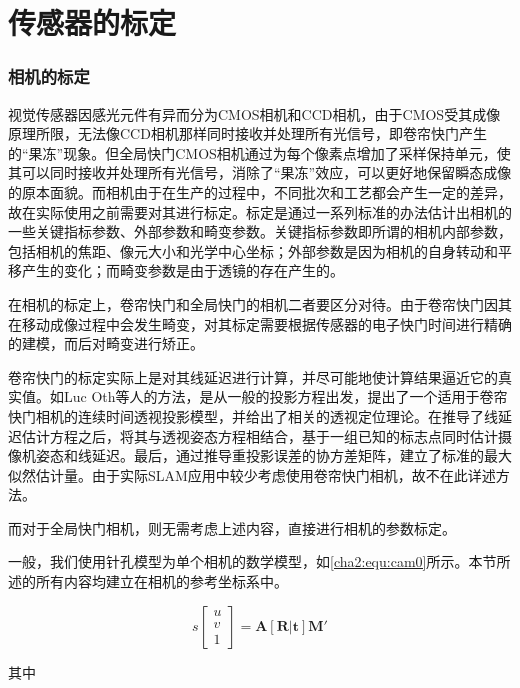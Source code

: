 \chapter{传感器的标定}
\label{cha:calibrations}

\subsection{相机的标定}
\label{cam_calib}
视觉传感器因感光元件有异而分为CMOS相机和CCD相机，由于CMOS受其成像原理所限，无法像CCD相机那样同时接收并处理所有光信号，即卷帘快门产生的“果冻”现象\cite{solutions2011shutter}。但全局快门CMOS相机通过为每个像素点增加了采样保持单元，使其可以同时接收并处理所有光信号，消除了“果冻”效应，可以更好地保留瞬态成像的原本面貌。而相机由于在生产的过程中，不同批次和工艺都会产生一定的差异，故在实际使用之前需要对其进行标定。标定是通过一系列标准的办法估计出相机的一些关键指标参数、外部参数和畸变参数。关键指标参数即所谓的相机内部参数，包括相机的焦距、像元大小和光学中心坐标；外部参数是因为相机的自身转动和平移产生的变化；而畸变参数是由于透镜的存在产生的。

在相机的标定上，卷帘快门和全局快门的相机二者要区分对待。由于卷帘快门因其在移动成像过程中会发生畸变，对其标定需要根据传感器的电子快门时间进行精确的建模，而后对畸变进行矫正。

卷帘快门的标定实际上是对其线延迟进行计算，并尽可能地使计算结果逼近它的真实值。如Luc Oth等人的方法\cite{oth2013rolling}，是从一般的投影方程出发，提出了一个适用于卷帘快门相机的连续时间透视投影模型，并给出了相关的透视定位理论。在推导了线延迟估计方程之后，将其与透视姿态方程相结合，基于一组已知的标志点同时估计摄像机姿态和线延迟。最后，通过推导重投影误差的协方差矩阵，建立了标准的最大似然估计量。由于实际SLAM应用中较少考虑使用卷帘快门相机，故不在此详述方法。

而对于全局快门相机，则无需考虑上述内容，直接进行相机的参数标定。

一般，我们使用针孔模型为单个相机的数学模型，如\ref{cha2:equ:cam0}所示。本节所述的所有内容均建立在相机的参考坐标系中。

\begin{equation}
  \label{cha2:equ:cam0}
  s\begin{bmatrix}
    u\\
    v\\
    1
  \end{bmatrix}
  = \mathbf{A}[\mathbf{R}|\mathbf{t}]\mathbf{M}'
\end{equation}

其中

